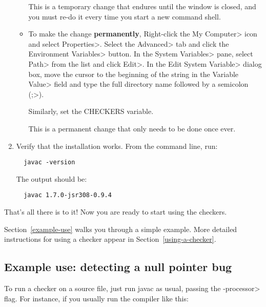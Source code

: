 \begin{enumerate}
\begin{itemize}
This is a temporary change that endures until the window is closed, and you
must re-do it every time you start a new command shell.

\item
To make the change \textbf{permanently},
Right-click the \<My Computer> icon and
select \<Properties>. Select the \<Advanced> tab and click the
\<Environment Variables> button. In the \<System Variables> pane, select
\<Path> from the list and click \<Edit>. In the \<Edit System Variable>
dialog box, move the cursor to the beginning of the string in the
\<Variable Value> field and type the full directory name followed by a
semicolon (\<;>).

Similarly, set the CHECKERS variable.

This is a permanent change that only needs to be done once ever.
\end{itemize}



\item
  Verify that the installation works.  From the command line, run:

\begin{Verbatim}
  javac -version
\end{Verbatim}

The output should be:

\begin{Verbatim}
  javac 1.7.0-jsr308-0.9.4
\end{Verbatim}

\end{enumerate}

That's all there is to it!  Now you are ready to start using the checkers.

Section~\ref{example-use} walks you through a simple example.  More detailed
instructions for using a checker appear in Section~\ref{using-a-checker}.



\subsection{Example use:  detecting a null pointer bug\label{example-use}}

To run a checker on a source file, just run javac as usual, passing the
\<-processor> flag.  For instance, if you usually run the compiler like
this:

